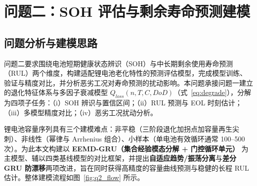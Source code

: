 
\section{问题二：SOH 评估与剩余寿命预测建模}
\label{sec:q2}

\subsection{问题分析与建模思路}
\label{sec:q2_overview}

问题二要求围绕电池短期健康状态辨识（SOH）与中长期剩余使用寿命预测（RUL）两个维度，构建适配锂电池老化特性的预测评估模型，完成模型训练、验证与精度对比，并分析恶劣工况对寿命预测的扰动影响。本问题承接问题一建立的退化特征体系与多因子衰减模型 $Q_{loss}(n,T,C,DoD)$（式~\eqref{eq:degrade}），分解为四项子任务：（i）SOH 辨识与置信区间；（ii）RUL 预测与 EOL 时刻估计；（iii）多模型精度对比；（iv）恶劣工况扰动分析。

锂电池容量序列具有三个建模难点\cite{Sto19}：非平稳（三阶段退化加拐点加容量再生尖刺）、非线性（幂律与 Arrhenius 组合）、小样本（单电池有效循环通常 100--500 次）。为此本文构建以 \textbf{EEMD-GRU（集合经验模态分解 + 门控循环单元）} 为主模型、辅以四类基线模型的对比框架，并提出\textbf{自适应趋势/振荡分离}与\textbf{差分 GRU 防漂移}两项改进，旨在同时获得高精度的容量曲线预测与稳健的长程 RUL 估计。整体建模流程如图~\ref{fig:q2_flow} 所示。

